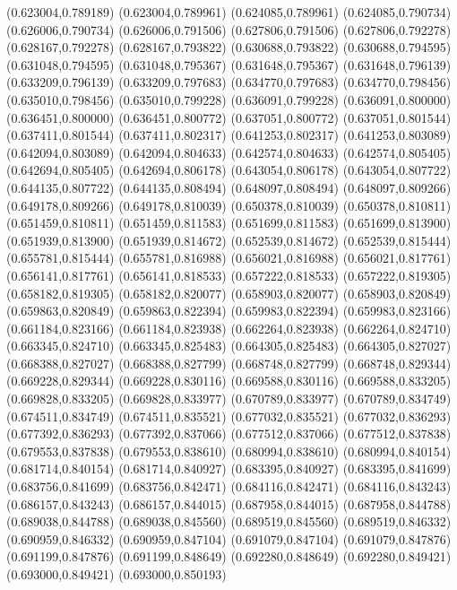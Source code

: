 (0.623004,0.789189)
(0.623004,0.789961)
(0.624085,0.789961)
(0.624085,0.790734)
(0.626006,0.790734)
(0.626006,0.791506)
(0.627806,0.791506)
(0.627806,0.792278)
(0.628167,0.792278)
(0.628167,0.793822)
(0.630688,0.793822)
(0.630688,0.794595)
(0.631048,0.794595)
(0.631048,0.795367)
(0.631648,0.795367)
(0.631648,0.796139)
(0.633209,0.796139)
(0.633209,0.797683)
(0.634770,0.797683)
(0.634770,0.798456)
(0.635010,0.798456)
(0.635010,0.799228)
(0.636091,0.799228)
(0.636091,0.800000)
(0.636451,0.800000)
(0.636451,0.800772)
(0.637051,0.800772)
(0.637051,0.801544)
(0.637411,0.801544)
(0.637411,0.802317)
(0.641253,0.802317)
(0.641253,0.803089)
(0.642094,0.803089)
(0.642094,0.804633)
(0.642574,0.804633)
(0.642574,0.805405)
(0.642694,0.805405)
(0.642694,0.806178)
(0.643054,0.806178)
(0.643054,0.807722)
(0.644135,0.807722)
(0.644135,0.808494)
(0.648097,0.808494)
(0.648097,0.809266)
(0.649178,0.809266)
(0.649178,0.810039)
(0.650378,0.810039)
(0.650378,0.810811)
(0.651459,0.810811)
(0.651459,0.811583)
(0.651699,0.811583)
(0.651699,0.813900)
(0.651939,0.813900)
(0.651939,0.814672)
(0.652539,0.814672)
(0.652539,0.815444)
(0.655781,0.815444)
(0.655781,0.816988)
(0.656021,0.816988)
(0.656021,0.817761)
(0.656141,0.817761)
(0.656141,0.818533)
(0.657222,0.818533)
(0.657222,0.819305)
(0.658182,0.819305)
(0.658182,0.820077)
(0.658903,0.820077)
(0.658903,0.820849)
(0.659863,0.820849)
(0.659863,0.822394)
(0.659983,0.822394)
(0.659983,0.823166)
(0.661184,0.823166)
(0.661184,0.823938)
(0.662264,0.823938)
(0.662264,0.824710)
(0.663345,0.824710)
(0.663345,0.825483)
(0.664305,0.825483)
(0.664305,0.827027)
(0.668388,0.827027)
(0.668388,0.827799)
(0.668748,0.827799)
(0.668748,0.829344)
(0.669228,0.829344)
(0.669228,0.830116)
(0.669588,0.830116)
(0.669588,0.833205)
(0.669828,0.833205)
(0.669828,0.833977)
(0.670789,0.833977)
(0.670789,0.834749)
(0.674511,0.834749)
(0.674511,0.835521)
(0.677032,0.835521)
(0.677032,0.836293)
(0.677392,0.836293)
(0.677392,0.837066)
(0.677512,0.837066)
(0.677512,0.837838)
(0.679553,0.837838)
(0.679553,0.838610)
(0.680994,0.838610)
(0.680994,0.840154)
(0.681714,0.840154)
(0.681714,0.840927)
(0.683395,0.840927)
(0.683395,0.841699)
(0.683756,0.841699)
(0.683756,0.842471)
(0.684116,0.842471)
(0.684116,0.843243)
(0.686157,0.843243)
(0.686157,0.844015)
(0.687958,0.844015)
(0.687958,0.844788)
(0.689038,0.844788)
(0.689038,0.845560)
(0.689519,0.845560)
(0.689519,0.846332)
(0.690959,0.846332)
(0.690959,0.847104)
(0.691079,0.847104)
(0.691079,0.847876)
(0.691199,0.847876)
(0.691199,0.848649)
(0.692280,0.848649)
(0.692280,0.849421)
(0.693000,0.849421)
(0.693000,0.850193)
